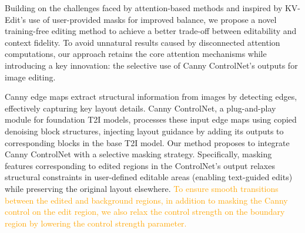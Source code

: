\documentclass{article}
\begin{document}







Building on the challenges faced by attention-based methods and inspired by KV-Edit’s use of user-provided masks for improved balance, we propose a novel training-free editing method to achieve a better trade-off between editability and context fidelity. To avoid unnatural results caused by disconnected attention computations, our approach retains the core attention mechanisms while introducing a key innovation: the selective use of Canny ControlNet’s outputs \citep{zhang2023adding} for image editing.

Canny edge maps \citep{canny1986computational} extract structural information from images by detecting edges, effectively capturing key layout details. Canny ControlNet, a plug-and-play module for foundation T2I models, processes these input edge maps using copied denoising block structures, injecting layout guidance by adding its outputs to corresponding blocks in the base T2I model. Our method proposes to integrate Canny ControlNet with a selective masking strategy. Specifically, masking features corresponding to edited regions in the ControlNet's output relaxes structural constraints in user-defined editable areas (enabling text-guided edits) while preserving the original layout elsewhere. \textcolor{orange}{To ensure smooth transitions between the edited and background regions, in addition to masking the Canny control on the edit region, we also relax the control strength on the boundary region by lowering the control strength parameter.}
\end{document}
